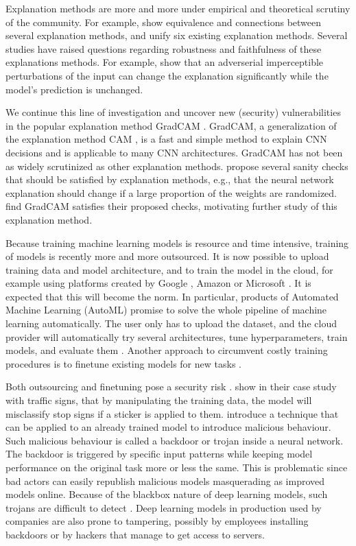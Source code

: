 \documentclass{article}
\begin{document}
Explanation methods are more and more under empirical and theoretical scrutiny of the community. For example, \citet{unifiedGradients} show equivalence and connections between several explanation methods, and \citet{SHAP} unify six existing explanation methods. Several studies  \citep{AxiomaticAttribution,patternnet,sanity,unreliable,fragile} 
have raised questions regarding robustness and faithfulness of these explanations methods. For example, \citet{fragile} show that an adverserial imperceptible perturbations of the input can change the explanation significantly while the model's prediction is unchanged. 

We continue this line of investigation and uncover new (security) vulnerabilities in the popular explanation method GradCAM \citep{GradCAM}. GradCAM, a generalization of the explanation method CAM \citep{Zhou_2016_CVPR}, is a fast and simple method to explain CNN decisions and is applicable to many CNN architectures. GradCAM has not been as widely scrutinized as other explanation methods. \citet{sanity} propose several sanity checks that should be satisfied by explanation methods, e.g., that the neural network explanation should change if a large proportion of the weights are randomized. \citet{sanity} find GradCAM satisfies their proposed checks, motivating further study of this explanation method.  


Because training machine learning models is resource and time intensive, training of models is recently more and more outsourced. It is now possible to upload training data and model architecture, and to train the model in the cloud, for example using platforms created by Google \citep{cloud_google}, Amazon \citep{cloud_amazon} or Microsoft \citep{cloud_azure}. It is expected that this will become the norm. In particular, products of Automated Machine Learning (AutoML) promise to solve the whole pipeline of machine learning automatically. The user only has to upload the dataset, and the cloud provider will automatically try several architectures, tune hyperparameters, train models, and evaluate them \citep{automl_survey}.
Another approach to circumvent costly training procedures is to finetune existing models for new tasks \citep{transferlearning}. 

Both outsourcing and finetuning pose a security risk \citep{badnets}. \citet{badnets} show in their case study with traffic signs, that by manipulating the training data, the model will misclassify stop signs if a sticker is applied to them. \citet{trojan} introduce a technique that can be applied to an already trained model to introduce malicious behaviour. Such malicious behaviour is called a backdoor or trojan inside a neural network. The backdoor is triggered by specific input patterns while keeping model performance on the original task more or less the same. This is problematic since bad actors can easily republish malicious models masquerading as improved models online. Because of the blackbox nature of deep learning models, such trojans are difficult to detect \citep{cleanse,Chen2019DetectingClustering}. Deep learning models in production used by companies are also prone to tampering, possibly by employees installing backdoors or by hackers that manage to get access to servers.
\end{document}
